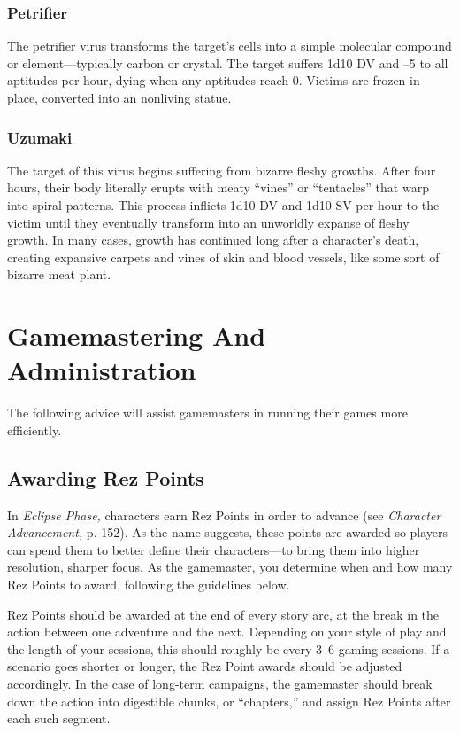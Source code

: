\subsubsection{Petrifier} 

The petrifier virus transforms the target's cells into a simple molecular compound or element—typically carbon or crystal. The target suffers 1d10 DV and –5 to all aptitudes per hour, dying when any aptitudes reach 0. Victims are frozen in place, converted into an nonliving statue. 

\subsubsection{Uzumaki} 

The target of this virus begins suffering from bizarre fleshy growths. After four hours, their body literally erupts with meaty ``vines'' or ``tentacles'' that warp into spiral patterns. This process inflicts 1d10 DV and 1d10 SV per hour to the victim until they eventually transform into an unworldly expanse of fleshy growth. In many cases, growth has continued long after a character's death, creating expansive carpets and vines of skin and blood vessels, like some sort of bizarre meat plant. 

\section{Gamemastering And Administration } 

The following advice will assist gamemasters in running their games more efficiently. 

\subsection{Awarding Rez Points } 

In \textit{Eclipse Phase,} characters earn Rez Points in order to advance (see \textit{Character Advancement,} p. 152). As the name suggests, these points are awarded so players can spend them to better define their characters—to bring them into higher resolution, sharper focus. As the gamemaster, you determine when and how many Rez Points to award, following the guidelines below. 

Rez Points should be awarded at the end of every story arc, at the break in the action between one adventure and the next. Depending on your style of play and the length of your sessions, this should roughly be every 3–6 gaming sessions. If a scenario goes shorter or longer, the Rez Point awards should be adjusted accordingly. In the case of long-term campaigns, the gamemaster should break down the action into digestible chunks, or ``chapters,'' and assign Rez Points after each such segment. 


